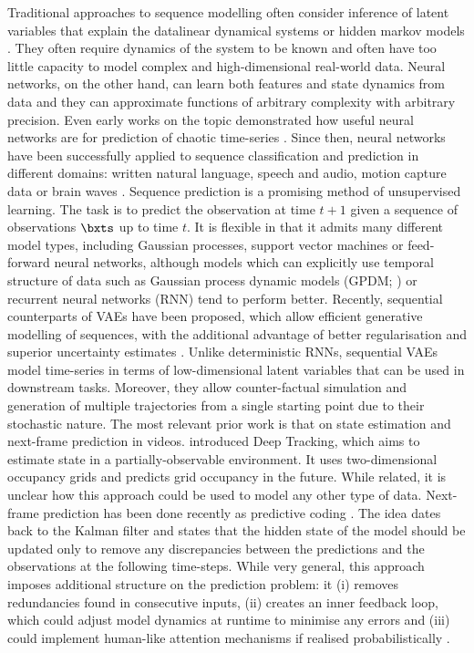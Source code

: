         Traditional approaches to sequence modelling often consider inference of latent variables that explain the data\eg linear dynamical systems or hidden markov models \citep{Bishop2006}.
        They often require dynamics of the system to be known and often have too little capacity to model complex and high-dimensional real-world data.
        Neural networks, on the other hand, can learn both features and state dynamics from data and they can approximate functions of arbitrary complexity with arbitrary precision.
        Even early works on the topic demonstrated how useful neural networks are for prediction of chaotic time-series \citep{Lapedes1988}.
        Since then, neural networks have been successfully applied to sequence classification and prediction in different domains: written natural language, speech and audio, motion capture data or brain waves \citep{Langkvist2014}.
%
%
        Sequence prediction is a promising method of unsupervised learning. The task is to predict the observation at time $t+1$ given a sequence of observations $\bxts$ up to time $t$. It is flexible in that it admits many different model types, including Gaussian processes, support vector machines or feed-forward neural networks, although models which can explicitly use temporal structure of data such as Gaussian process dynamic models (GPDM; \cite{Wang2008}) or recurrent neural networks (RNN) tend to perform better. Recently, sequential counterparts of VAEs have been proposed, which allow efficient generative modelling of sequences, with the additional advantage of better regularisation and superior uncertainty estimates \citep{Fabius2015,Bayer2015,Karl2017,Fortunato2017}. Unlike deterministic RNNs, sequential VAEs model time-series in terms of low-dimensional latent variables that can be used in downstream tasks. Moreover, they allow counter-factual simulation and generation of multiple trajectories from a single starting point due to their stochastic nature.
%        
%      
        The most relevant prior work is that on state estimation and next-frame prediction in videos. \cite{Ondruska2016} introduced Deep Tracking, which aims to estimate state in a partially-observable environment. It uses two-dimensional occupancy grids and predicts grid occupancy in the future. While related, it is unclear how this approach could be used to model any other type of data. Next-frame prediction has been done recently as predictive coding \citep{Lotter2016, Canziani2017}. The idea dates back to the Kalman filter \citep{Kalman1960} and states that the hidden state of the model should be updated only to remove any discrepancies between the predictions and the observations at the following time-steps. While very general, this approach imposes additional structure on the prediction problem: it (i) removes redundancies found in consecutive inputs, (ii) creates an inner feedback loop, which could adjust model dynamics at runtime to minimise any errors and (iii) could implement human-like attention mechanisms if realised probabilistically \citep{Friston2009guide}. 
    
